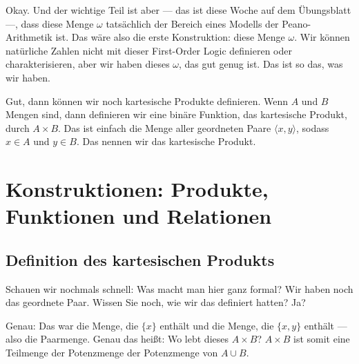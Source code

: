 \begin{spoken-clean}[00:51:19 - 00:53:29]
Okay. Und der wichtige Teil ist aber --- das ist diese Woche auf dem Übungsblatt ---, dass diese Menge $\omega$ tatsächlich der Bereich eines Modells der Peano-Arithmetik ist. Das wäre also die erste Konstruktion: diese Menge $\omega$. Wir können natürliche Zahlen nicht mit dieser First-Order Logic definieren oder charakterisieren, aber wir haben dieses $\omega$, das gut genug ist. Das ist so das, was wir haben.

Gut, dann können wir noch kartesische Produkte definieren. Wenn $A$ und $B$ Mengen sind, dann definieren wir eine binäre Funktion, das kartesische Produkt, durch $A \times B$. Das ist einfach die Menge aller geordneten Paare $\langle x, y \rangle$, sodass $x \in A$ und $y \in B$. Das nennen wir das kartesische Produkt.
\end{spoken-clean}

\section{Konstruktionen: Produkte, Funktionen und Relationen}

\subsection{Definition des kartesischen Produkts}
\begin{math-stroke}
\end{math-stroke}

\begin{spoken-clean}[continued]
Schauen wir nochmals schnell: Was macht man hier ganz formal? Wir haben noch das geordnete Paar. Wissen Sie noch, wie wir das definiert hatten? Ja?

Genau: Das war die Menge, die $\{x\}$ enthält und die Menge, die $\{x, y\}$ enthält --- also die Paarmenge. Genau das heißt: Wo lebt dieses $A \times B$? $A \times B$ ist somit eine Teilmenge der Potenzmenge der Potenzmenge von $A \cup B$.
\end{spoken-clean}

